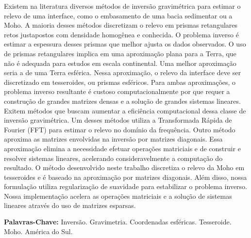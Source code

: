 \documentclass[12pt]{letter}
\begin{document}
Existem na literatura diversos métodos de inversão gravimétrica para estimar o
relevo de uma interface, como o embasamento de uma bacia sedimentar ou a Moho.
A maioria desses métodos discretizam o relevo em prismas retangulares retos
justapostos com densidade homogênea e conhecida.
O problema inverso é estimar a espessura desses prismas que melhor ajusta os
dados observados.
O uso de prismas retangulares implica em uma aproximação plana para a Terra,
que não é adequada para estudos em escala continental.
Uma melhor aproximação seria a de uma Terra esférica.
Nessa aproximação, o relevo da interface deve ser discretizado em tesseroides,
ou prismas esféricos.
Para ambas aproximações, o problema inverso resultante é custoso
computacionalmente por que requer a construção de grandes matrizes densas e a
solução de grandes sistemas lineares.
Exitem métodos que buscam aumentar a eficiência computacional dessa classe de
inversão gravimétrica.
Um desses métodos utiliza a Transformada Rápida de Fourier (FFT) para estimar o
relevo no domínio da frequência.
Outro método aproxima as matrizes envolvidas na inversão por matrizes
diagonais.
Essa aproximação elimina a necessidade efetuar operações matriciais e de
construir e resolver sistemas lineares, acelerando consideravelmente a
computação do resultado.
O método desenvolvido neste trabalho discretiza o relevo da Moho em tesseroides
e é baseado na aproximação por matrizes diagonais.
Além disso, nossa formulação utiliza regularização de suavidade para
estabilizar o problema inverso.
Nossa implementação acelera as operações matriciais e a solução de sistemas
lineares através do uso de matrizes esparsas.



\textbf{Palavras-Chave:}
Inversão. Gravimetria. Coordenadas esféricas. Tesseroide. Moho. América do Sul.
\end{document}
